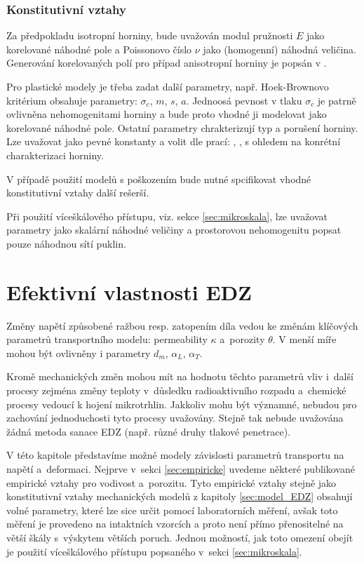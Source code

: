 \documentclass{article}
\begin{document}
\subsubsection{Konstitutivní vztahy}
Za předpokladu isotropní horniny, bude uvažován modul pružnosti $E$  jako korelované náhodné pole 
a Poissonovo číslo $\nu$ jako (homogenní) náhodná veličina. Generování korelovaných polí pro případ 
anisotropní horniny je popsán v \cite{Tang2018}.

Pro plastické modely je třeba zadat další parametry, např. Hoek-Brownovo kritérium obsahuje parametry:
$\sigma_c$, $m$, $s$, $a$. Jednoosá pevnost v tlaku $\sigma_c$ je patrně ovlivněna nehomogenitami horniny a bude proto vhodné 
ji modelovat jako  korelované náhodné pole. Ostatní parametry chrakterizují typ a porušení horniny. Lze uvažovat jako pevné konstanty
a volit dle prací: \cite{Martin1999}, \cite{Hajiabdolmajid2002}, \cite{Hoek2002} s ohledem na konrétní charakterizaci horniny.

V případě použití modelů s poškozením bude nutné spcifikovat vhodné konstitutivní vztahy další rešerší. 

Při použití víceškálového přístupu, viz. sekce \ref{sec:mikroskala}, lze uvažovat parametry jako skalární náhodné veličiny a
prostorovou nehomogenitu popsat pouze náhodnou sítí puklin.



\section{Efektivní vlastnosti EDZ}
\label{sec:micro_EDZ}
Změny napětí způsobené ražbou resp. zatopením díla vedou ke změnám klíčových parametrů transportního modelu:
permeability $\kappa$ a~porozity $\theta$. V menší míře mohou být ovlivněny i parametry $d_m$, $\alpha_L$, $\alpha_T$.

Kromě mechanických změn mohou mít na hodnotu těchto parametrů vliv i~další procesy zejména změny teploty v~důsledku radioaktivního rozpadu
a~chemické procesy vedoucí k hojení mikrotrhlin. Jakkoliv mohu být významné, nebudou pro zachování jednoduchosti tyto procesy uvažovány.
Stejně tak nebude uvažována žádná metoda sanace EDZ (např. různé druhy tlakové penetrace).

V této kapitole představíme možné modely závislosti parametrů transportu na napětí a~deformaci.
Nejprve v~sekci \ref{sec:empiricke} uvedeme některé publikované empirické vztahy pro vodivost a~porozitu.
Tyto empirické vztahy stejně jako konstitutivní vztahy mechanických modelů z kapitoly \ref{sec:model_EDZ} 
obsahují volné parametry, které lze sice určit pomocí laboratorních měření, avšak toto měření je provedeno na intaktních vzorcích
a proto není přímo přenositelné na větší škály s~výskytem větších poruch. Jednou možností, jak toto omezení obejít je
použití víceškálového přístupu popsaného v~sekci  \ref{sec:mikroskala}.
\end{document}
